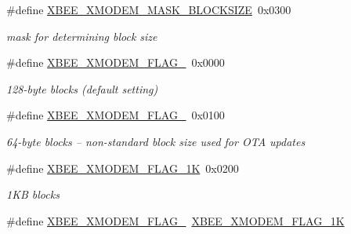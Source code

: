 \begin{DoxyCompactItemize}
\mbox{\label{group__util__xmodem_gaaf04a39f137887085821e34f3e808ee1}} 
\#define \hyperlink{group__util__xmodem_gaaf04a39f137887085821e34f3e808ee1}{X\+B\+E\+E\+\_\+\+X\+M\+O\+D\+E\+M\+\_\+\+M\+A\+S\+K\+\_\+\+B\+L\+O\+C\+K\+S\+I\+ZE}~0x0300
\begin{DoxyCompactList}\small\item\em mask for determining block size \end{DoxyCompactList}\item 
\mbox{\label{group__util__xmodem_ga46eeab5e2a5ef0efbdb5f0706fa9f26c}} 
\#define \hyperlink{group__util__xmodem_ga46eeab5e2a5ef0efbdb5f0706fa9f26c}{X\+B\+E\+E\+\_\+\+X\+M\+O\+D\+E\+M\+\_\+\+F\+L\+A\+G\+\_}~0x0000
\begin{DoxyCompactList}\small\item\em 128-\/byte blocks (default setting) \end{DoxyCompactList}\item 
\mbox{\label{group__util__xmodem_ga9c55ba56c6cba75308ee8b0b8594a6c4}} 
\#define \hyperlink{group__util__xmodem_ga9c55ba56c6cba75308ee8b0b8594a6c4}{X\+B\+E\+E\+\_\+\+X\+M\+O\+D\+E\+M\+\_\+\+F\+L\+A\+G\+\_}~0x0100
\begin{DoxyCompactList}\small\item\em 64-\/byte blocks -- non-\/standard block size used for O\+TA updates \end{DoxyCompactList}\item 
\mbox{\label{group__util__xmodem_ga2a13979799d1a7ef697025608545f995}} 
\#define \hyperlink{group__util__xmodem_ga2a13979799d1a7ef697025608545f995}{X\+B\+E\+E\+\_\+\+X\+M\+O\+D\+E\+M\+\_\+\+F\+L\+A\+G\+\_\+1K}~0x0200
\begin{DoxyCompactList}\small\item\em 1\+KB blocks \end{DoxyCompactList}\item 
\mbox{\label{group__util__xmodem_ga177f2ec8f42b568c7f461f729f00bf2b}} 
\#define \hyperlink{group__util__xmodem_ga177f2ec8f42b568c7f461f729f00bf2b}{X\+B\+E\+E\+\_\+\+X\+M\+O\+D\+E\+M\+\_\+\+F\+L\+A\+G\+\_}~\hyperlink{group__util__xmodem_ga2a13979799d1a7ef697025608545f995}{X\+B\+E\+E\+\_\+\+X\+M\+O\+D\+E\+M\+\_\+\+F\+L\+A\+G\+\_\+1K}

\end{DoxyCompactItemize}

